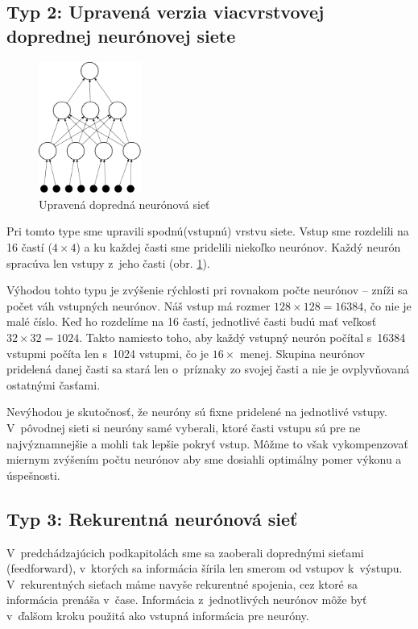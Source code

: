 \subsection{Typ 2: Upravená verzia viacvrstvovej doprednej neurónovej siete}

\begin{figure}[h]
  \begin{center}
    \includegraphics[width=0.3\textwidth]{images/dffnn}
  \end{center}
  \caption{Upravená dopredná neurónová sieť}
  \label{fig:dffnn}
\end{figure}

Pri tomto type sme upravili spodnú(vstupnú) vrstvu siete. Vstup sme rozdelili na 16 častí ($4\times 4$) a ku každej časti sme pridelili niekoľko neurónov.
Každý neurón spracúva len vstupy z~jeho časti (obr. \ref{fig:dffnn}). 

Výhodou tohto typu je zvýšenie rýchlosti pri rovnakom počte neurónov -- zníži sa počet váh vstupných neurónov. Náš vstup má rozmer $128\times 128 = 16384$, čo nie je malé číslo. Keď ho rozdelíme na 16 častí, jednotlivé časti budú mať veľkosť $32\times 32 = 1024$. Takto namiesto toho, aby každý vstupný neurón počítal s~16384 vstupmi počíta len s~1024 vstupmi, čo je $16\times$ menej. Skupina neurónov pridelená danej časti sa stará len o~príznaky zo svojej časti a nie je ovplyvňovaná ostatnými časťami. 

Nevýhodou je skutočnosť, že neuróny sú fixne pridelené na jednotlivé vstupy. V~pôvodnej sieti si neuróny samé vyberali, ktoré časti vstupu sú pre ne najvýznamnejšie a mohli tak lepšie pokryť vstup. Môžme to však vykompenzovať miernym zvýšením počtu neurónov aby sme dosiahli optimálny pomer výkonu a úspešnosti.

\subsection{Typ 3: Rekurentná neurónová sieť}

V~predchádzajúcich podkapitolách sme sa zaoberali doprednými sieťami (feedforward), v~ktorých sa informácia šírila len smerom od vstupov k~výstupu. V~rekurentných sieťach máme navyše rekurentné spojenia, cez ktoré sa informácia prenáša v~čase. Informácia z~jednotlivých neurónov môže byť v~ďalšom kroku použitá ako vstupná informácia pre neuróny.


